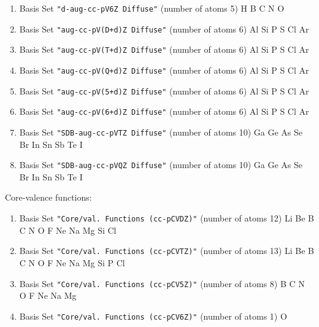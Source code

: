 \begin{enumerate}
\item Basis Set \verb#"d-aug-cc-pV6Z Diffuse"# (number of atoms 5)  \newline
  H B C N O

\item Basis Set \verb#"aug-cc-pV(D+d)Z Diffuse"# (number of atoms 6)  \newline
  Al Si P S Cl Ar


\item Basis Set \verb#"aug-cc-pV(T+d)Z Diffuse"# (number of atoms 6)  \newline
  Al Si P S Cl Ar


\item Basis Set \verb#"aug-cc-pV(Q+d)Z Diffuse"# (number of atoms 6)  \newline
  Al Si P S Cl Ar


\item Basis Set \verb#"aug-cc-pV(5+d)Z Diffuse"# (number of atoms 6)  \newline
  Al Si P S Cl Ar


\item Basis Set \verb#"aug-cc-pV(6+d)Z Diffuse"# (number of atoms 6)  \newline
  Al Si P S Cl Ar


\item Basis Set \verb#"SDB-aug-cc-pVTZ Diffuse"# (number of atoms 10)  \newline
  Ga Ge As Se Br In Sn Sb Te I


\item Basis Set \verb#"SDB-aug-cc-pVQZ Diffuse"# (number of atoms 10)  \newline
  Ga Ge As Se Br In Sn Sb Te I

\end{enumerate}

Core-valence functions:

\begin{enumerate}

\item Basis Set \verb#"Core/val. Functions (cc-pCVDZ)"# (number of atoms 12)  \newline
  Li Be B C N O F Ne Na Mg Si Cl


\item Basis Set \verb#"Core/val. Functions (cc-pCVTZ)"# (number of atoms 13)  \newline
  Li Be B C N O F Ne Na Mg Si P Cl


\item Basis Set \verb#"Core/val. Functions (cc-pCV5Z)"# (number of atoms 8)  \newline
  B C N O F Ne Na Mg


\item Basis Set \verb#"Core/val. Functions (cc-pCV6Z)"# (number of atoms 1)  \newline
  O

\end{enumerate}

\fussy


